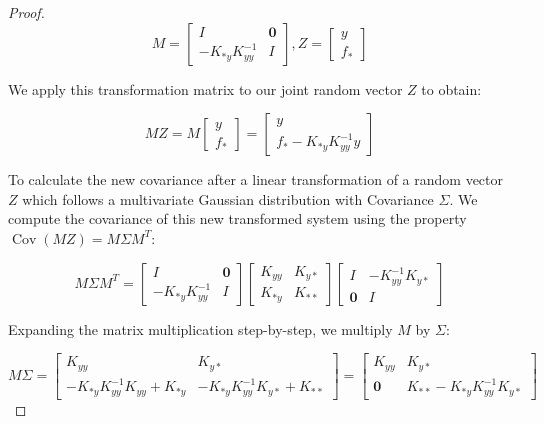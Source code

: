 \documentclass[12pt,oneside]{report}
\theoremstyle{definition}
\theoremstyle{remark}
\begin{document}
\begin{proof}
$$M = \begin{bmatrix} I & \mathbf{0} \\ -K_{*y}K_{yy}^{-1} & I \end{bmatrix}, Z=\begin{bmatrix} y \\ f_* \end{bmatrix}$$

We apply this transformation matrix to our joint random vector $Z$ to obtain:

$$MZ = M \begin{bmatrix} y \\ f_* \end{bmatrix} = \begin{bmatrix} y \\ f_* - K_{*y}K_{yy}^{-1}y \end{bmatrix}$$

To calculate the new covariance after a linear transformation of a random vector $Z$ which follows a multivariate Gaussian distribution with Covariance $\Sigma$. We compute the covariance of this new transformed system using the property $\operatorname{Cov}(MZ) = M \Sigma M^T$:

\begin{equation}
M \Sigma M^T = \begin{bmatrix} I & \mathbf{0} \\ -K_{*y}K_{yy}^{-1} & I \end{bmatrix} \begin{bmatrix} K_{yy} & K_{y*} \\ K_{*y} & K_{**} \end{bmatrix} \begin{bmatrix} I & -K_{yy}^{-1}K_{y*} \\ \mathbf{0} & I \end{bmatrix}
\label{eq:z_linear_transform}
\end{equation}

Expanding the matrix multiplication step-by-step, we multiply $M$ by $\Sigma$:

$$M \Sigma = \begin{bmatrix} K_{yy} & K_{y*} \\ -K_{*y}K_{yy}^{-1}K_{yy} + K_{*y} & -K_{*y}K_{yy}^{-1}K_{y*} + K_{**} \end{bmatrix} = \begin{bmatrix} K_{yy} & K_{y*} \\ \mathbf{0} & K_{**} - K_{*y}K_{yy}^{-1}K_{y*} \end{bmatrix}$$


\end{proof}
\end{document}
